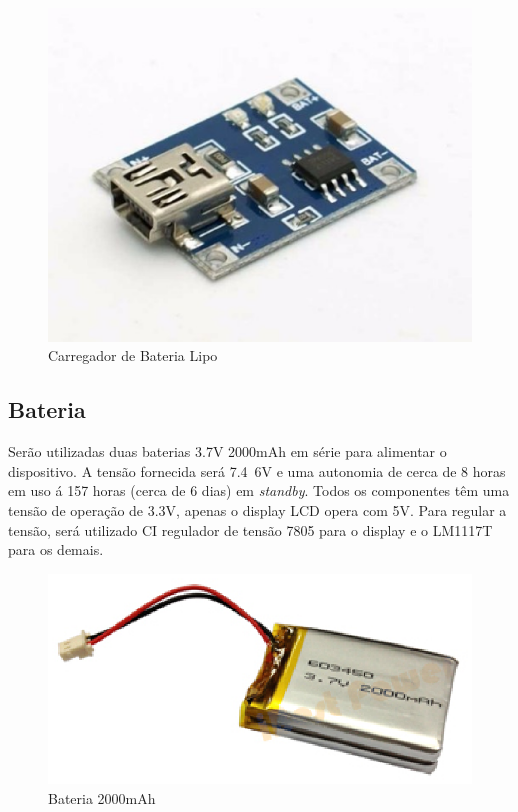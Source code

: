 \begin{figure}[!h]
  \centering
  \includegraphics[keepaspectratio=true,scale=0.45]{figuras/carregador.eps}
  \caption{Carregador de Bateria Lipo}
\end{figure}

\subsection{Bateria}
Serão utilizadas duas baterias 3.7V 2000mAh em série para alimentar o dispositivo. A tensão fornecida será 7.4~6V e uma autonomia de cerca de 8 horas em uso á 157 horas (cerca de 6 dias) em \textit{standby}. Todos os componentes têm uma tensão de operação de 3.3V, apenas o display LCD opera com 5V. Para regular a tensão, será utilizado CI regulador de tensão 7805 para o display e o LM1117T para os demais.

\begin{figure}[!h]
  \centering
  \includegraphics[keepaspectratio=true,scale=0.7]{figuras/bateria.eps}
  \caption{Bateria 2000mAh}
\end{figure}


